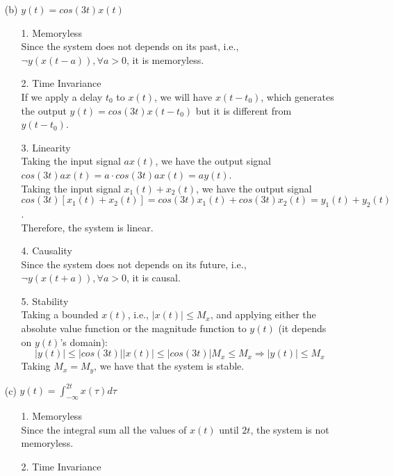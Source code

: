 \documentclass{article}
\begin{document}
\begin{enumerate}
    \item[(b)] $y(t) = cos(3t)x(t)  $
        \begin{enumerate}
            \item[1.] Memoryless \\
                Since the system does not depends on its past, i.e., $\neg y(x(t-a)), \forall a > 0$, it is memoryless.
            \item[2.] Time Invariance \\
                If we apply a delay $t_{0}$ to $x(t)$, we will have $x(t-t_{0})$, which generates the output $y(t) = cos(3t)x(t-t_{0})$ but it is different from $y(t-t_{0})$.  
            \item[3.] Linearity \\ 
                Taking the input signal $ax(t)$, we have the output signal $cos(3t)ax(t) = a\cdot cos(3t)ax(t) = ay(t)$. \\
                Taking the input signal $x_{1}(t)+x_{2}(t)$, we have the output signal $cos(3t)[x_{1}(t)+x_{2}(t)] = cos(3t)x_{1}(t)+cos(3t)x_{2}(t) = y_{1}(t)+y_{2}(t)$. \\
                Therefore, the system is linear.
            \item[4.] Causality \\
                Since the system does not depends on its future, i.e., $\neg y(x(t+a)), \forall a > 0$, it is causal.
            \item[5.] Stability \\
                Taking a bounded $x(t)$, i.e., $|x(t)| \leq M_{x}$, and applying either the absolute value function or the magnitude function to $y(t)$ (it depends on $y(t)$'s domain):
                \begin{equation*}
                |y(t)| \leq |cos(3t)||x(t)| \leq |cos(3t)|M_{x} \leq M_{x} \Rightarrow |y(t)| \leq M_{x}
                \end{equation*}
                Taking $M_{x}=M_{y}$, we have that the system is stable.
        \end{enumerate}
    \item[(c)] $y(t) = \int_{-\infty}^{2t} x(\tau)d\tau $
        \begin{enumerate}
            \item[1.] Memoryless \\
                Since the integral sum all the values of $x(t)$ until $2t$, the system is not memoryless.
            \item[2.] Time Invariance \\

\end{enumerate}
\end{enumerate}
\end{document}
